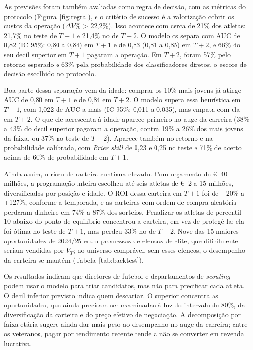 \documentclass[article, 12pt, oneside, a4paper, english, brazil, section=TITLE]{abntex2}
\begin{document}
As previsões foram também avaliadas como regra de decisão, com as métricas do protocolo (Figura~\ref{fig:regra}), e o critério de sucesso é a valorização cobrir os custos da operação ($\Delta V\%$ > 22,2\%).
Isso acontece com cerca de 21\% dos atletas: 21,7\% no teste de $T+1$ e 21,4\% no de $T+2$.
O modelo os separa com AUC de 0,82 (IC 95\%: 0,80 a 0,84) em $T+1$ e de 0,83 (0,81 a 0,85) em $T+2$, e 66\% do seu decil superior em $T+1$ pagaram a operação.
Em $T+2$, foram 57\% pelo retorno esperado e 63\% pela probabilidade dos classificadores diretos, o escore de decisão escolhido no protocolo.

Boa parte dessa separação vem da idade: comprar os 10\% mais jovens já atinge AUC de 0,80 em $T+1$ e de 0,84 em $T+2$.
O modelo supera essa heurística em $T+1$, com 0,022 de AUC a mais (IC 95\%: 0,011 a 0,035), mas empata com ela em $T+2$.
O que ele acrescenta à idade aparece primeiro no auge da carreira (38\% a 43\% do decil superior pagaram a operação, contra 19\% a 26\% dos mais jovens da faixa, ou 37\% no teste de $T+2$).
Aparece também no retorno e na probabilidade calibrada, com \textit{Brier skill} de 0,23 e 0,25 no teste e 71\% de acerto acima de 60\% de probabilidade em $T+1$.

Ainda assim, o risco de carteira continua elevado.
Com orçamento de €~40 milhões, a programação inteira escolheu até seis atletas de €~2 a 15 milhões, diversificados por posição e idade.
O ROI dessa carteira em $T+1$ foi de −20\% a +127\%, conforme a temporada, e as carteiras com ordem de compra aleatória perderam dinheiro em 74\% a 87\% dos sorteios.
Penalizar os atletas de percentil 10 abaixo do ponto de equilíbrio concentrou a carteira, em vez de protegê-la: ela foi ótima no teste de $T+1$, mas perdeu 33\% no de $T+2$.
Nove das 15 maiores oportunidades de 2024/25 eram promessas de elencos de elite, que dificilmente seriam vendidas por $V_T$; no universo comprável, sem esses elencos, o desempenho da carteira se mantém (Tabela~\ref{tab:backtest}).

Os resultados indicam que diretores de futebol e departamentos de \textit{scouting} podem usar o modelo para triar candidatos, mas não para precificar cada atleta.
O decil inferior previsto indica quem descartar.
O superior concentra as oportunidades, que ainda precisam ser examinadas à luz do intervalo de 80\%, da diversificação da carteira e do preço efetivo de negociação.
A decomposição por faixa etária sugere ainda dar mais peso ao desempenho no auge da carreira; entre os veteranos, pagar por rendimento recente tende a não se converter em revenda lucrativa.
\end{document}
